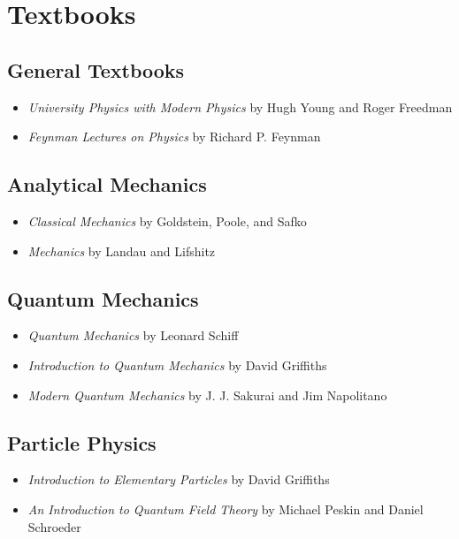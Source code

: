 \chapter{Textbooks}
\section{General Textbooks}
\begin{itemize}
  \item \emph{University Physics with Modern Physics} by Hugh Young and Roger Freedman \cite{young-freedman}
  \item \emph{Feynman Lectures on Physics} by Richard P. Feynman \cite{feynman-lectures-online}
\end{itemize}

\section{Analytical Mechanics}
\begin{itemize}
  \item \emph{Classical Mechanics} by Goldstein, Poole, and Safko \cite{goldstein-classical}
  \item \emph{Mechanics} by Landau and Lifshitz \cite{landau-mechanics}
\end{itemize}

\section{Quantum Mechanics}
\begin{itemize}
  \item \emph{Quantum Mechanics} by Leonard Schiff \cite{schiff}
  \item \emph{Introduction to Quantum Mechanics} by David Griffiths \cite{griffiths-qm}
  \item \emph{Modern Quantum Mechanics} by J. J. Sakurai and Jim Napolitano \cite{jjsakurai-qm}
\end{itemize}


\section{Particle Physics}
\begin{itemize}
  \item \emph{Introduction to Elementary Particles} by David Griffiths \cite{griffith-introToEP}
  \item \emph{An Introduction to Quantum Field Theory} by Michael Peskin and Daniel Schroeder \cite{peskin-introToQFT}
\end{itemize}